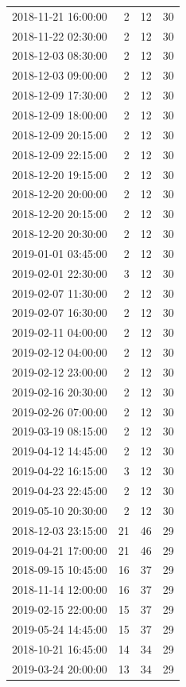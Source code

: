 \begin{tabular}{lrrr}
2018-11-21 16:00:00 & 2 & 12 & 30 \\
2018-11-22 02:30:00 & 2 & 12 & 30 \\
2018-12-03 08:30:00 & 2 & 12 & 30 \\
2018-12-03 09:00:00 & 2 & 12 & 30 \\
2018-12-09 17:30:00 & 2 & 12 & 30 \\
2018-12-09 18:00:00 & 2 & 12 & 30 \\
2018-12-09 20:15:00 & 2 & 12 & 30 \\
2018-12-09 22:15:00 & 2 & 12 & 30 \\
2018-12-20 19:15:00 & 2 & 12 & 30 \\
2018-12-20 20:00:00 & 2 & 12 & 30 \\
2018-12-20 20:15:00 & 2 & 12 & 30 \\
2018-12-20 20:30:00 & 2 & 12 & 30 \\
2019-01-01 03:45:00 & 2 & 12 & 30 \\
2019-02-01 22:30:00 & 3 & 12 & 30 \\
2019-02-07 11:30:00 & 2 & 12 & 30 \\
2019-02-07 16:30:00 & 2 & 12 & 30 \\
2019-02-11 04:00:00 & 2 & 12 & 30 \\
2019-02-12 04:00:00 & 2 & 12 & 30 \\
2019-02-12 23:00:00 & 2 & 12 & 30 \\
2019-02-16 20:30:00 & 2 & 12 & 30 \\
2019-02-26 07:00:00 & 2 & 12 & 30 \\
2019-03-19 08:15:00 & 2 & 12 & 30 \\
2019-04-12 14:45:00 & 2 & 12 & 30 \\
2019-04-22 16:15:00 & 3 & 12 & 30 \\
2019-04-23 22:45:00 & 2 & 12 & 30 \\
2019-05-10 20:30:00 & 2 & 12 & 30 \\
2018-12-03 23:15:00 & 21 & 46 & 29 \\
2019-04-21 17:00:00 & 21 & 46 & 29 \\
2018-09-15 10:45:00 & 16 & 37 & 29 \\
2018-11-14 12:00:00 & 16 & 37 & 29 \\
2019-02-15 22:00:00 & 15 & 37 & 29 \\
2019-05-24 14:45:00 & 15 & 37 & 29 \\
2018-10-21 16:45:00 & 14 & 34 & 29 \\
2019-03-24 20:00:00 & 13 & 34 & 29 \\

\end{tabular}
